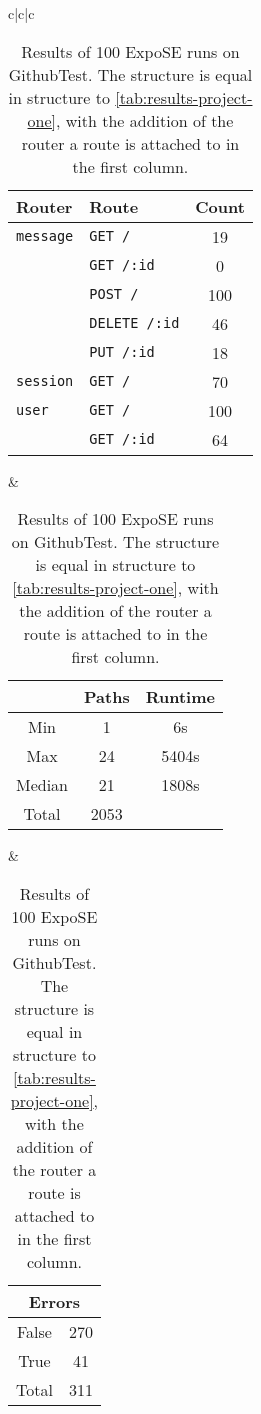 \begin{table}[t]
    \centering

    \begin{tabular*}{\linewidth}{c|c|c}
       \begin{tabular}[t]{llc}
            \toprule
                        Router          & Route  & Count\\
            \midrule
            \lstinline+message+         & \lstinline+GET /+       & 19    \\
                                        & \lstinline+GET /:id+    & 0   \\
                                        & \lstinline+POST /+      & 100   \\
    	                                & \lstinline+DELETE /:id+ &  46   \\
                                        & \lstinline+PUT /:id+    &  18 \\
            \lstinline+session+         & \lstinline+GET /+       & 70  \\
            \lstinline+user+            & \lstinline+GET /+       & 100 \\                                  
                                        & \lstinline+GET /:id+    & 64   \\
            \bottomrule
        \end{tabular}
  & 
        \begin{tabular}[t]{ccc}
            \toprule
                    & Paths    & Runtime \\
            \midrule
            Min     &  1       & 6s   \\
            Max     &   24     & 5404s       \\
	        Median  &  21      & 1808s        \\
            Total   &   2053   &   \\
            \bottomrule
        \end{tabular} 
&     
        \begin{tabular}[t]{cc}
            \toprule
            \multicolumn{2}{c}{Errors} \\        
            \midrule
            False   &   270 \\
            True    &   41 \\
            Total   &   311  \\
            \bottomrule
        \end{tabular}
\\
    \end{tabular*}
\caption[General results of GithubTest]{Results of 100 ExpoSE runs on GithubTest. The structure is equal in structure to \autoref{tab:results-project-one}, with the addition of the router a route is attached to in the first column. }
\label{tab:results-project-two}
\end{table}

